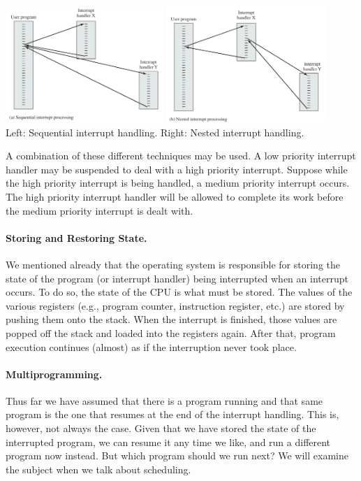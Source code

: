 \begin{center}
\includegraphics[width=0.45\textwidth]{images/interrupts-seq.png}
\includegraphics[width=0.45\textwidth]{images/interrupts-nest.png}\\
Left: Sequential interrupt handling. Right: Nested interrupt handling.~\cite{osi}
\end{center}

A combination of these different techniques may be used. A low priority interrupt handler may be suspended to deal with a high priority interrupt. Suppose while the high priority interrupt is being handled, a medium priority interrupt occurs. The high priority interrupt handler will be allowed to complete its work before the medium priority interrupt is dealt with.


\paragraph{Storing and Restoring State.} We mentioned already that the operating system is responsible for storing the state of the program (or interrupt handler) being interrupted when an interrupt occurs. To do so, the state of the CPU is what must be stored. The values of the various registers (e.g., program counter, instruction register, etc.) are stored by pushing them onto the stack. When the interrupt is finished, those values are popped off the stack and loaded into the registers again. After that, program execution continues (almost) as if the interruption never took place.

\paragraph{Multiprogramming.} Thus far we have assumed that there is a program running and that same program is the one that resumes at the end of the interrupt handling. This is, however, not always the case. Given that we have stored the state of the interrupted program, we can resume it any time we like, and run a different program now instead. But which program should we run next? We will examine the subject when we talk about scheduling.

